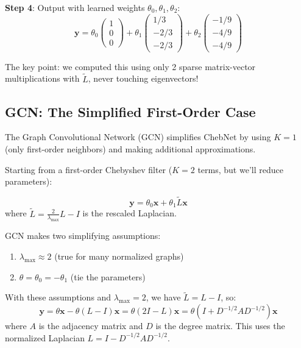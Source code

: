 \begin{notechapter}
\begin{example}
\textbf{Step 4}: Output with learned weights $\theta_0, \theta_1, \theta_2$:
\[
\mathbf{y} = \theta_0 \begin{pmatrix} 1 \\ 0 \\ 0 \end{pmatrix}
+ \theta_1 \begin{pmatrix} 1/3 \\ -2/3 \\ -2/3 \end{pmatrix}
+ \theta_2 \begin{pmatrix} -1/9 \\ -4/9 \\ -4/9 \end{pmatrix}
\]

The key point: we computed this using only 2 sparse matrix-vector 
multiplications with $\tilde{L}$, never touching eigenvectors!
\end{example}

\subsection{GCN: The Simplified First-Order Case}

The Graph Convolutional Network (GCN) \cite{dft-to-gnn:kipf2017semi} 
simplifies ChebNet by using $K=1$ (only first-order neighbors) and 
making additional approximations.

Starting from a first-order Chebyshev filter ($K=2$ terms, but we'll 
reduce parameters):

\[
\mathbf{y} = \theta_0 \mathbf{x} + \theta_1 \tilde{L} \mathbf{x}
\]
where $\tilde{L} = \frac{2}{\lambda_{\max}}L - I$ is the rescaled Laplacian.

GCN makes two simplifying assumptions:
\begin{enumerate}
\item $\lambda_{\max} \approx 2$ (true for many normalized graphs)
\item $\theta = \theta_0 = -\theta_1$ (tie the parameters)
\end{enumerate}

With these assumptions and $\lambda_{\max} = 2$, we have 
$\tilde{L} = L - I$, so:
\[
\mathbf{y} = \theta \mathbf{x} - \theta(L - I)\mathbf{x} 
           = \theta(2I - L)\mathbf{x}
           = \theta(I + D^{-1/2} A D^{-1/2})\mathbf{x}
\]
where $A$ is the adjacency matrix and $D$ is the degree matrix. This 
uses the normalized Laplacian $L = I - D^{-1/2} A D^{-1/2}$.


\end{notechapter}
